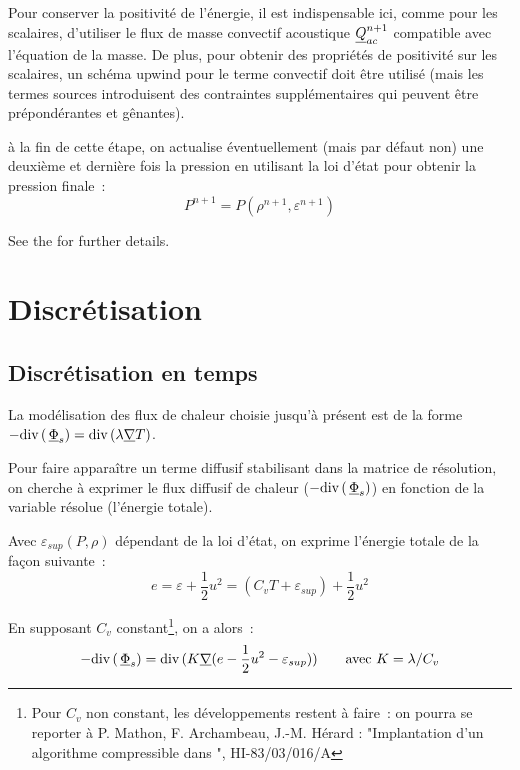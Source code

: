 Pour conserver la positivité de l'énergie, il est indispensable ici,
comme pour les scalaires, d'utiliser le flux de masse convectif acoustique
$\underline{Q}_{ac}^{n+1}$ compatible avec l'équation de la masse.
De plus, pour obtenir des propriétés de positivité sur les scalaires,
un schéma upwind pour le terme convectif doit être utilisé
(mais les termes sources introduisent des contraintes supplémentaires
qui peuvent être prépondérantes et gênantes).

\vspace{0.5cm}

à la fin de cette étape, on actualise éventuellement
(mais par défaut non)
une deuxième et dernière fois la pression
en utilisant la loi d'état pour obtenir la pression finale~:
\begin{equation}
\displaystyle P^{n+1}=P(\rho^{n+1},\varepsilon^{n+1})
\end{equation}

See the  for further details.

\section*{Discrétisation}

\subsection*{Discrétisation en temps}

La modélisation des flux de chaleur choisie jusqu'à présent est de la
forme $-\text{div}\,(\,\underline{\Phi}_s) = \text{div}\,(\lambda \underline{\nabla}{T})$.

Pour faire apparaître un terme diffusif stabilisant dans la
matrice de résolution, on cherche à exprimer le flux diffusif de chaleur
($-\text{div}\,(\,\underline{\Phi}_s)$)
en fonction de la variable résolue (l'énergie totale).

Avec $\varepsilon_{sup}(P,\rho)$
dépendant de la loi d'état, on exprime l'énergie totale de la façon suivante~:
\begin{equation}
e = \varepsilon + \frac{1}{2} u^2
= (C_v T + \varepsilon_{sup}) + \frac{1}{2} u^2
\end{equation}

En supposant $C_v$ constant\footnote{Pour $C_v$ non constant, les
développements restent à faire~: on pourra se
reporter à  P. Mathon, F. Archambeau, J.-M. Hérard : "Implantation d'un
algorithme compressible dans \CS", HI-83/03/016/A}, on a alors~:
\begin{equation}\label{Cfbl_Cfener_eq_flux_thermique_cfener}
-\text{div}\,(\,\underline{\Phi}_s)
= \text{div}\,(K \underline{\nabla}(e - \frac{1}{2} u^2 - \varepsilon_{sup}))\qquad
\text{avec } K=\lambda / C_v
\end{equation}


